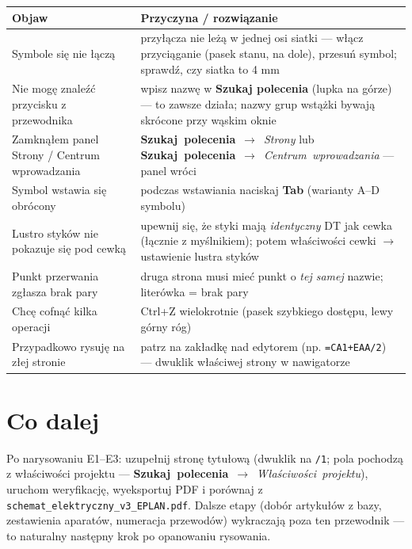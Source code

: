 \documentclass[11pt,a4paper]{article}
\newcommand{\ui}[1]{\textbf{#1}}                    %
\newcommand{\szukaj}[1]{\mbox{\ui{Szukaj polecenia} $\to$ \emph{#1}}} %
\begin{document}
\begin{longtable}{@{}p{}p{}@{}}
\toprule
\textbf{Objaw} & \textbf{Przyczyna / rozwiązanie}\\
\midrule
\endhead
Symbole się nie łączą & przyłącza nie leżą w jednej osi siatki --- włącz przyciąganie (pasek
stanu, na dole), przesuń symbol; sprawdź, czy siatka to 4 mm\\
Nie mogę znaleźć przycisku z przewodnika & wpisz nazwę w \ui{Szukaj polecenia} (lupka na górze)
--- to zawsze działa; nazwy grup wstążki bywają skrócone przy wąskim oknie\\
Zamknąłem panel Strony / Centrum wprowadzania & \szukaj{Strony} lub \szukaj{Centrum
wprowadzania} --- panel wróci\\
Symbol wstawia się obrócony & podczas wstawiania naciskaj \textbf{Tab} (warianty A--D symbolu)\\
Lustro styków nie pokazuje się pod cewką & upewnij się, że styki mają \emph{identyczny} DT jak
cewka (łącznie z myślnikiem); potem właściwości cewki $\to$ ustawienie lustra styków\\
Punkt przerwania zgłasza brak pary & druga strona musi mieć punkt o \emph{tej samej} nazwie;
literówka = brak pary\\
Chcę cofnąć kilka operacji & Ctrl+Z wielokrotnie (pasek szybkiego dostępu, lewy górny róg)\\
Przypadkowo rysuję na złej stronie & patrz na zakładkę nad edytorem (np. \texttt{=CA1+EAA/2})
--- dwuklik właściwej strony w nawigatorze\\
\bottomrule
\end{longtable}

\section{Co dalej}
Po narysowaniu E1--E3: uzupełnij stronę tytułową (dwuklik na \texttt{/1}; pola pochodzą
z właściwości projektu --- \szukaj{Właściwości projektu}), uruchom weryfikację, wyeksportuj PDF
i porównaj z \texttt{schemat\_elektryczny\_v3\_EPLAN.pdf}. Dalsze etapy (dobór artykułów z bazy,
zestawienia aparatów, numeracja przewodów) wykraczają poza ten przewodnik --- to naturalny
następny krok po opanowaniu rysowania.
\end{document}
